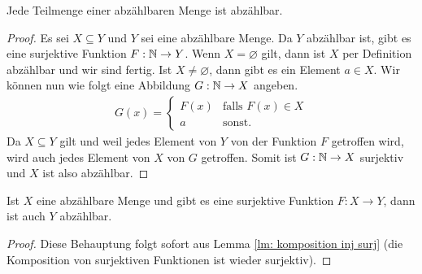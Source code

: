 \begin{satz}
Jede Teilmenge einer abzählbaren Menge ist abzählbar.
\end{satz}
\begin{proof}
Es sei $X\subseteq Y$ und $Y$ sei eine abzählbare Menge. Da $Y$ abzählbar ist,
gibt es eine surjektive Funktion $F:\mathbb{N}\to Y$. Wenn $X=\varnothing$ gilt, dann
ist $X$ per Definition abzählbar und wir sind fertig. Ist $X\neq\varnothing$,
dann gibt es ein Element $a\in X$. Wir können nun wie folgt eine Abbildung
$G:\mathbb{N}\to X$ angeben.
\begin{align*}
G(x)=\begin{cases}
F(x)&\text{falls }F(x)\in X\\
a&\text{sonst.}
\end{cases}
\end{align*}
Da $X\subseteq Y$ gilt und weil jedes Element von $Y$ von der Funktion $F$
getroffen wird, wird auch jedes Element von $X$ von $G$ getroffen. Somit
ist $G:\mathbb{N}\to X$ surjektiv und $X$ ist also abzählbar.
\end{proof}

\begin{satz}\label{satz:abzaehlbarTransitiv}
Ist $X$ eine abzählbare Menge und gibt es eine surjektive Funktion $F:X\to Y$, dann ist auch $Y$ abzählbar.
\end{satz}
\begin{proof}
Diese Behauptung folgt sofort aus Lemma \ref{lm: komposition inj surj} (die Komposition von surjektiven Funktionen ist wieder surjektiv).
\end{proof}



